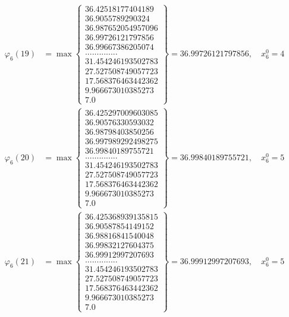 \documentclass{article}
\begin{document}
\begin{align*}
  
  
  
\varphi_{6}(19) &= \max \left\{ \begin{array}{c}
36.42518177404189 \\
 36.9055789290324 \\
 36.987652054957096 \\
 36.99726121797856 \\
 36.99667386205074 \\
 .............. \\
 31.454246193502783 \\
 27.527508749057723 \\
 17.568376463442362 \\
 9.966673010385273 \\
 7.0
\end{array} \right\} = 36.99726121797856, \quad x_{6}^0 = 4\\
  
  
  
  
\varphi_{6}(20) &= \max \left\{ \begin{array}{c}
36.425297009603085 \\
 36.90576330593032 \\
 36.98798403850256 \\
 36.997989292498275 \\
 36.99840189755721 \\
 .............. \\
 31.454246193502783 \\
 27.527508749057723 \\
 17.568376463442362 \\
 9.966673010385273 \\
 7.0
\end{array} \right\} = 36.99840189755721, \quad x_{6}^0 = 5\\
  
  
  
  
\varphi_{6}(21) &= \max \left\{ \begin{array}{c}
36.425368939135815 \\
 36.90587854149152 \\
 36.98816841540048 \\
 36.99832127604375 \\
 36.99912997207693 \\
 .............. \\
 31.454246193502783 \\
 27.527508749057723 \\
 17.568376463442362 \\
 9.966673010385273 \\
 7.0
\end{array} \right\} = 36.99912997207693, \quad x_{6}^0 = 5\\
  

\end{align*}
\end{document}
